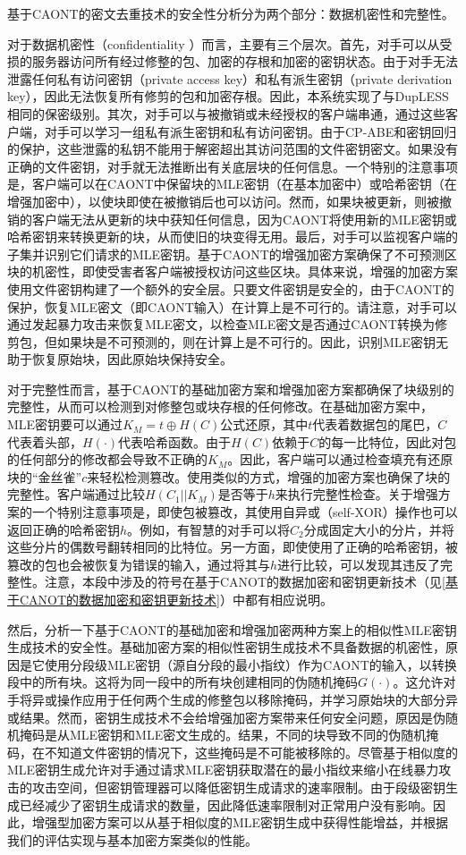 \documentclass[promaster]{thesis-uestc}
\begin{document}
基于CAONT的密文去重技术的安全性分析分为两个部分：数据机密性和完整性。

对于数据机密性（confidentiality ）而言，主要有三个层次。首先，对手可以从受损的服务器访问所有经过修整的包、加密的存根和加密的密钥状态。由于对手无法泄露任何私有访问密钥（private access key）和私有派生密钥（private derivation key），因此无法恢复所有修剪的包和加密存根。因此，本系统实现了与DupLESS相同的保密级别。其次，对手可以与被撤销或未经授权的客户端串通，通过这些客户端，对手可以学习一组私有派生密钥和私有访问密钥。由于CP-ABE和密钥回归的保护，这些泄露的私钥不能用于解密超出其访问范围的文件密钥密文。如果没有正确的文件密钥，对手就无法推断出有关底层块的任何信息。一个特别的注意事项是，客户端可以在CAONT中保留块的MLE密钥（在基本加密中）或哈希密钥（在增强加密中），以使块即使在被撤销后也可以访问。然而，如果块被更新，则被撤销的客户端无法从更新的块中获知任何信息，因为CAONT将使用新的MLE密钥或哈希密钥来转换更新的块，从而使旧的块变得无用。最后，对手可以监视客户端的子集并识别它们请求的MLE密钥。基于CAONT的增强加密方案确保了不可预测区块的机密性，即使受害者客户端被授权访问这些区块。具体来说，增强的加密方案使用文件密钥构建了一个额外的安全层。只要文件密钥是安全的，由于CAONT的保护，恢复MLE密文（即CAONT输入）在计算上是不可行的。请注意，对手可以通过发起暴力攻击来恢复MLE密文，以检查MLE密文是否通过CAONT转换为修剪包，但如果块是不可预测的，则在计算上是不可行的。因此，识别MLE密钥无助于恢复原始块，因此原始块保持安全。

对于完整性而言，基于CAONT的基础加密方案和增强加密方案都确保了块级别的完整性，从而可以检测到对修整包或块存根的任何修改。在基础加密方案中，MLE密钥要可以通过$K_M = t \oplus H(C)$公式还原，其中$t$代表着数据包的尾巴，$C$代表着头部，$H(\cdot)$代表哈希函数。由于$H(C)$依赖于$C$的每一比特位，因此对包的任何部分的修改都会导致不正确的$K_M$。因此，客户端可以通过检查填充有还原块的“金丝雀”$c$来轻松检测篡改。使用类似的方式，增强的加密方案也确保了块的完整性。客户端通过比较$H(C_1||K_M)$是否等于$h$来执行完整性检查。关于增强方案的一个特别注意事项是，即使包被篡改，其使用自异或（self-XOR）操作也可以返回正确的哈希密钥$h$。例如，有智慧的对手可以将$C_2$分成固定大小的分片，并将这些分片的偶数号翻转相同的比特位。另一方面，即使使用了正确的哈希密钥，被篡改的包也会被恢复为错误的输入，通过将其与$h$进行比较，可以发现其违反了完整性。注意，本段中涉及的符号在基于CANOT的数据加密和密钥更新技术（见\ref{基于CANOT的数据加密和密钥更新技术}）中都有相应说明。

然后，分析一下基于CAONT的基础加密和增强加密两种方案上的相似性MLE密钥生成技术的安全性。基础加密方案的相似性密钥生成技术不具备数据的机密性，原因是它使用分段级MLE密钥（源自分段的最小指纹）作为CAONT的输入，以转换段中的所有块。这将为同一段中的所有块创建相同的伪随机掩码$G(\cdot)$。这允许对手将异或操作应用于任何两个生成的修整包以移除掩码，并学习原始块的大部分异或结果。然而，密钥生成技术不会给增强加密方案带来任何安全问题，原因是伪随机掩码是从MLE密钥和MLE密文生成的。结果，不同的块导致不同的伪随机掩码，在不知道文件密钥的情况下，这些掩码是不可能被移除的。尽管基于相似度的MLE密钥生成允许对手通过请求MLE密钥获取潜在的最小指纹来缩小在线暴力攻击的攻击空间，但密钥管理器可以降低密钥生成请求的速率限制。由于段级密钥生成已经减少了密钥生成请求的数量，因此降低速率限制对正常用户没有影响。因此，增强型加密方案可以从基于相似度的MLE密钥生成中获得性能增益，并根据我们的评估实现与基本加密方案类似的性能。
\end{document}
